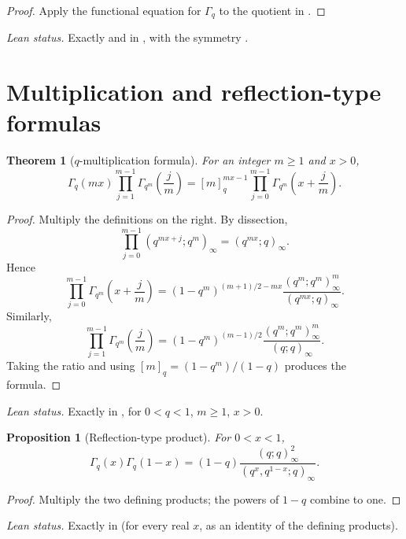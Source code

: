 \documentclass[11pt,a4paper,oneside,openany]{book}
\newtheorem{theorem}{Theorem}[chapter]
\newtheorem{proposition}[proposition]{Proposition}
\theoremstyle{definition}
\theoremstyle{remark}
\begin{document}
\begin{proof}
Apply the functional equation for $\Gamma_q$ to the quotient in .
\end{proof}

\emph{Lean status.}  Exactly  and
 in , with the symmetry
.


\section{Multiplication and reflection-type formulas}

\begin{theorem}[$q$-multiplication formula]\label{thm:qgamma-multiplication}
For an integer $m\ge1$ and $x>0$,
\[
 \Gamma_q(mx)\prod_{j=1}^{m-1}\Gamma_{q^m}\!\left(\frac jm\right)
 =[m]_q^{mx-1}
 \prod_{j=0}^{m-1}\Gamma_{q^m}\!\left(x+\frac jm\right).
\]
\end{theorem}

\begin{proof}
Multiply the definitions on the right.  By dissection,
\[
 \prod_{j=0}^{m-1}(q^{mx+j};q^m)_\infty=(q^{mx};q)_\infty.
\]
Hence
\[
 \prod_{j=0}^{m-1}\Gamma_{q^m}\!\left(x+\frac jm\right)
 =(1-q^m)^{(m+1)/2-mx}
 \frac{(q^m;q^m)_\infty^m}{(q^{mx};q)_\infty}.
\]
Similarly,
\[
 \prod_{j=1}^{m-1}\Gamma_{q^m}\!\left(\frac jm\right)
 =(1-q^m)^{(m-1)/2}
 \frac{(q^m;q^m)_\infty^m}{(q;q)_\infty}.
\]
Taking the ratio and using
\(
 [m]_q=(1-q^m)/(1-q)
\)
produces the formula.
\end{proof}

\emph{Lean status.}  Exactly  in
, for $0<q<1$, $m\ge1$, $x>0$.


\begin{proposition}[Reflection-type product]\label{prop:qgamma-reflection}
For $0<x<1$,
\[
 \Gamma_q(x)\Gamma_q(1-x)
 =(1-q)\frac{(q;q)_\infty^2}
 {(q^x,q^{1-x};q)_\infty}.
\]
\end{proposition}

\begin{proof}
Multiply the two defining products; the powers of $1-q$ combine to one.
\end{proof}

\emph{Lean status.}  Exactly  in 
(for every real $x$, as an identity of the defining products).
\end{document}
